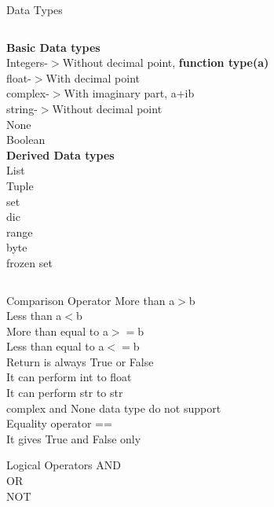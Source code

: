 \documentclass[aspectratio=169, 10pt]{beamer}
\begin{document}
\begin{frame}[t]{Data Types}

\begin{columns}[t]
\textbf{Basic Data types}\\
Integers-\-$>$Without decimal point, \textbf{function type(a)}\\
float-\-$>$With decimal point\\
complex-\-$>$With imaginary part, a+ib\\
string-\-$>$Without decimal point\\
None\\
Boolean\\
\textbf{Derived Data types}\\
List\\
Tuple\\
set\\
dic\\
range\\
byte\\
frozen set\\
\end{columns}
\end{frame}
\begin{frame}[t]{Comparison Operator}
More than a$>$b\\
Less than a$<$b\\
More than equal to a$>=$b\\
Less than equal to a$<=$b\\
Return is always True or False\\ 
It can perform int to float\\
It can perform str to str\\
complex and None data type do not support\\ 
\vspace{1Cm}
Equality operator ==\\
It gives True and False only
\end{frame}

\begin{frame}[t]{Logical Operators}
AND\\
OR\\
NOT\\
\end{frame}
\end{document}
